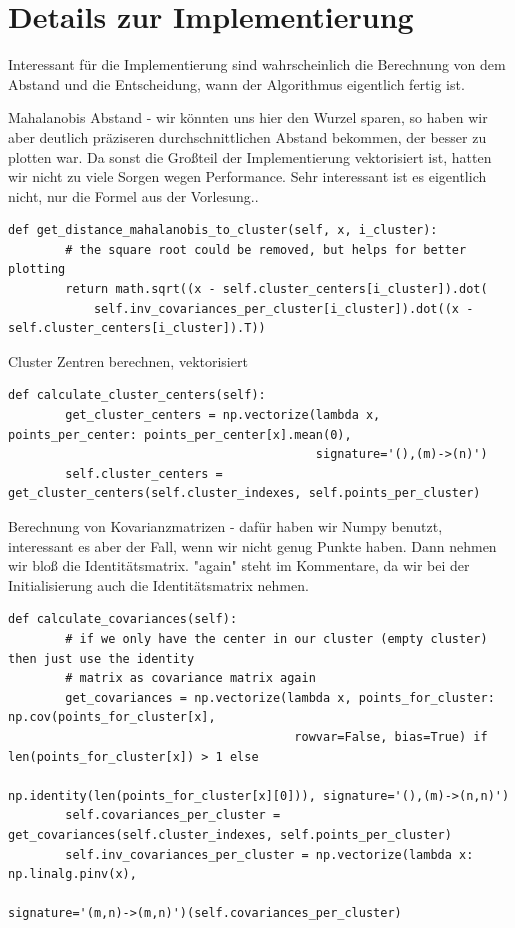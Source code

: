 \section*{Details zur Implementierung}

Interessant für die Implementierung sind wahrscheinlich die Berechnung von dem Abstand und die Entscheidung,
wann der Algorithmus eigentlich fertig ist.


Mahalanobis Abstand - wir könnten uns hier den Wurzel sparen, so haben wir aber deutlich präziseren
durchschnittlichen Abstand bekommen, der besser zu plotten war. Da sonst die Großteil der Implementierung
vektorisiert ist, hatten wir nicht zu viele Sorgen wegen Performance. Sehr interessant ist es eigentlich nicht,
nur die Formel aus der Vorlesung..

\begin{lstlisting}[style=py]
    def get_distance_mahalanobis_to_cluster(self, x, i_cluster):
        # the square root could be removed, but helps for better plotting
        return math.sqrt((x - self.cluster_centers[i_cluster]).dot(
            self.inv_covariances_per_cluster[i_cluster]).dot((x - self.cluster_centers[i_cluster]).T))
\end{lstlisting}



Cluster Zentren berechnen, vektorisiert
\begin{lstlisting}[style=py]
    def calculate_cluster_centers(self):
        get_cluster_centers = np.vectorize(lambda x, points_per_center: points_per_center[x].mean(0),
                                           signature='(),(m)->(n)')
        self.cluster_centers = get_cluster_centers(self.cluster_indexes, self.points_per_cluster)
\end{lstlisting}


Berechnung von Kovarianzmatrizen - dafür haben wir Numpy benutzt, interessant es aber der Fall, wenn wir nicht genug
Punkte haben. Dann nehmen wir bloß die Identitätsmatrix. "again" steht im Kommentare, da wir bei der Initialisierung
auch die Identitätsmatrix nehmen.
\begin{lstlisting}[style=py]
    def calculate_covariances(self):
        # if we only have the center in our cluster (empty cluster) then just use the identity
        # matrix as covariance matrix again
        get_covariances = np.vectorize(lambda x, points_for_cluster: np.cov(points_for_cluster[x],
                                        rowvar=False, bias=True) if len(points_for_cluster[x]) > 1 else
                                        np.identity(len(points_for_cluster[x][0])), signature='(),(m)->(n,n)')
        self.covariances_per_cluster = get_covariances(self.cluster_indexes, self.points_per_cluster)
        self.inv_covariances_per_cluster = np.vectorize(lambda x: np.linalg.pinv(x),
                                                        signature='(m,n)->(m,n)')(self.covariances_per_cluster)
\end{lstlisting}


